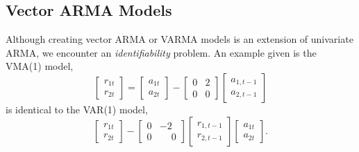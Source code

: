 
\subsection{Vector ARMA Models}
Although creating vector ARMA or VARMA models is an extension of univariate ARMA, we encounter an \emph{identifiability} problem. An example given is the VMA(1) model,
\[
\begin{bmatrix}
r_{1t} \\ r_{2t}
\end{bmatrix} =
\begin{bmatrix}
a_{1t} \\ a_{2t}
\end{bmatrix} -
\begin{bmatrix}
0 & 2 \\ 0 & 0
\end{bmatrix}
\begin{bmatrix}
a_{1,t-1} \\ a_{2,t-1}
\end{bmatrix}
\]
is identical to the VAR(1) model,
\[
\begin{bmatrix}
r_{1t} \\ r_{2t}
\end{bmatrix} -
\begin{bmatrix}
0 & -2 \\ 0 & \phantom{-}0
\end{bmatrix}
\begin{bmatrix}
r_{1,t-1} \\ r_{2,t-1}
\end{bmatrix}
\begin{bmatrix}
a_{1t} \\ a_{2t}
\end{bmatrix}.
\]


